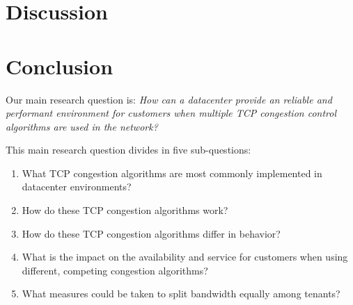 \documentclass{article}
\begin{document}
\section{Discussion}


\section{Conclusion}


Our main research question is:
{\it How can a datacenter provide an reliable and performant environment for
customers when multiple TCP congestion control algorithms are used in the
network?}

\vspace{0.5cm}

This main research question divides in five sub-questions:

\begin{enumerate}
	\item What TCP congestion algorithms are most commonly implemented in datacenter environments?
	\item How do these TCP congestion algorithms work?
	\item How do these TCP congestion algorithms differ in behavior?
	\item What is the impact on the availability and service for customers when using different, competing congestion algorithms?
	\item What measures could be taken to split bandwidth equally among tenants?
\end{enumerate}


\end{document}
